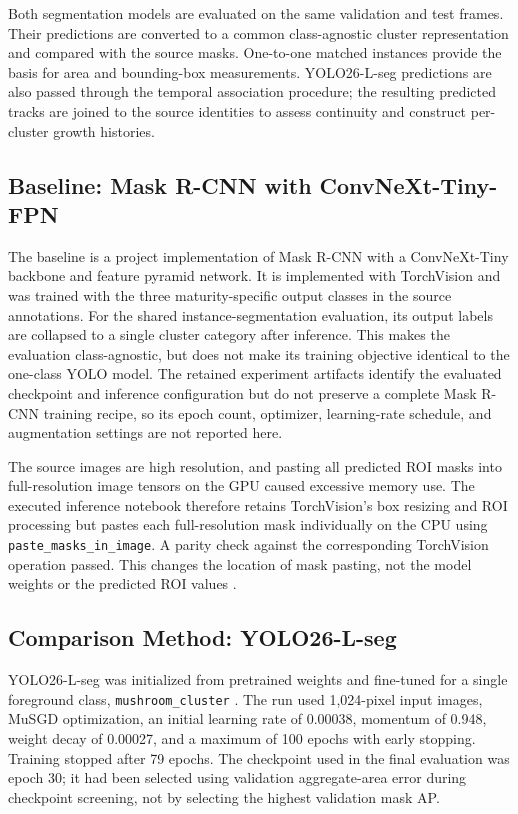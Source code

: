 \documentclass[11pt,a4paper]{article}
\begin{document}
Both segmentation models are evaluated on the same validation and test frames. Their predictions are converted to a common class-agnostic cluster representation and compared with the source masks. One-to-one matched instances provide the basis for area and bounding-box measurements. YOLO26-L-seg predictions are also passed through the temporal association procedure; the resulting predicted tracks are joined to the source identities to assess continuity and construct per-cluster growth histories.

\subsection{Baseline: Mask R-CNN with ConvNeXt-Tiny-FPN}

The baseline is a project implementation of Mask R-CNN with a ConvNeXt-Tiny backbone and feature pyramid network. It is implemented with TorchVision and was trained with the three maturity-specific output classes in the source annotations. For the shared instance-segmentation evaluation, its output labels are collapsed to a single cluster category after inference. This makes the evaluation class-agnostic, but does not make its training objective identical to the one-class YOLO model. The retained experiment artifacts identify the evaluated checkpoint and inference configuration but do not preserve a complete Mask R-CNN training recipe, so its epoch count, optimizer, learning-rate schedule, and augmentation settings are not reported here.

The source images are high resolution, and pasting all predicted ROI masks into full-resolution image tensors on the GPU caused excessive memory use. The executed inference notebook therefore retains TorchVision's box resizing and ROI processing but pastes each full-resolution mask individually on the CPU using \texttt{paste\_masks\_in\_image}. A parity check against the corresponding TorchVision operation passed. This changes the location of mask pasting, not the model weights or the predicted ROI values \cite{pytorch,torchvision}.

\subsection{Comparison Method: YOLO26-L-seg}

YOLO26-L-seg was initialized from pretrained weights and fine-tuned for a single foreground class, \texttt{mushroom\_cluster} \cite{yolo26docs}. The run used 1,024-pixel input images, MuSGD optimization, an initial learning rate of 0.00038, momentum of 0.948, weight decay of 0.00027, and a maximum of 100 epochs with early stopping. Training stopped after 79 epochs. The checkpoint used in the final evaluation was epoch 30; it had been selected using validation aggregate-area error during checkpoint screening, not by selecting the highest validation mask AP.
\end{document}
